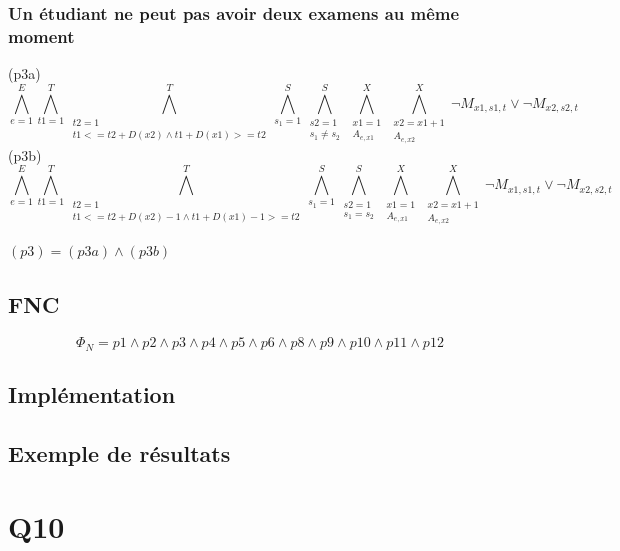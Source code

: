 \documentclass[a4paper,11pt]{article}
\begin{document}
\subsubsection{Un étudiant ne peut pas avoir deux examens au même moment}
(p3a)
\begin{displaymath}
\bigwedge\limits_{e=1}^{E}\bigwedge\limits_{t1=1}^{T}\bigwedge\limits_{\substack{t2=1 \\ t1 <= t2 + D(x2) \wedge t1 + D(x1) >= t2}}^{T}\bigwedge\limits_{s_{1}=1}^{S}\bigwedge\limits_{\substack{s2=1 \\ s_{1} \neq s_{2}}}^{S}\bigwedge\limits_{\substack{x1=1 \\ A_{e,x1}}}^{X}\bigwedge\limits_{\substack{x2=x1+1 \\ A_{e,x2}}}^{X} \neg M_{x1, s1, t} \vee \neg M_{x2, s2, t}
\end{displaymath}
(p3b)
\begin{displaymath}
\bigwedge\limits_{e=1}^{E}\bigwedge\limits_{t1=1}^{T}\bigwedge\limits_{\substack{t2=1 \\ t1 <= t2 + D(x2)-1 \wedge t1 + D(x1)-1 >= t2}}^{T}\bigwedge\limits_{s_{1}=1}^{S}\bigwedge\limits_{\substack{s2=1 \\ s_{1} = s_{2}}}^{S}\bigwedge\limits_{\substack{x1=1 \\ A_{e,x1}}}^{X}\bigwedge\limits_{\substack{x2=x1+1 \\ A_{e,x2}}}^{X} \neg M_{x1, s1, t} \vee \neg M_{x2, s2, t}
\end{displaymath}

$ (p3) = (p3a) \wedge (p3b) $
\subsection{FNC}
\begin{displaymath}
	\Phi_{N} = p1 \wedge p2 \wedge p3 \wedge p4 \wedge p5 \wedge p6 \wedge p8 \wedge p9 \wedge p10 \wedge p11 \wedge p12
\end{displaymath}
\subsection{Implémentation}
\subsection{Exemple de résultats}

\section{Q10}
\end{document}
